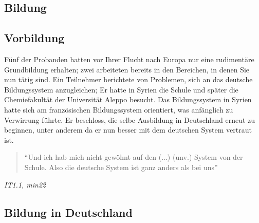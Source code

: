 \subsection{Bildung}


\subsection{Vorbildung}
Fünf der Probanden hatten vor Ihrer Flucht nach Europa nur eine rudimentäre Grundbildung erhalten; zwei arbeiteten bereits in den Bereichen, in denen Sie nun tätig sind.\newline
Ein Teilnehmer berichtete von Problemen, sich an das deutsche Bildungssystem anzugleichen; Er hatte in Syrien die Schule und später die Chemiefakultät der Universität Aleppo besucht. Das Bildungssystem in Syrien hatte sich am französischen Bildungssystem orientiert, was anfänglich zu Verwirrung führte.
Er beschloss, die selbe Ausbildung in Deutschland erneut zu beginnen, unter anderem da er nun besser mit dem deutschen System vertraut ist.

\begin{quote}
    ``Und ich hab mich nicht gewöhnt auf den (...) (unv.) System von der Schule. Also die deutsche System ist ganz anders als bei uns''
\end{quote}
\centerline{\textit{IT1.1, min22}}
\subsection{Bildung in Deutschland}

